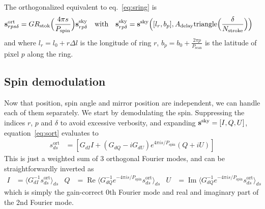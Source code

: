 \documentclass{article}
\renewcommand{\Re}{\operatorname{Re}}
\renewcommand{\Im}{\operatorname{Im}}
\renewcommand{\vec}[1]{{\bf #1}}
\begin{document}
The orthogonalized equivalent to eq.~\ref{eq:sring} is
\begin{align}
	\vec s^\textrm{ort}_{rps\delta} &= G R_\textrm{stok}
		\Big(\frac{4\pi s}{P_\textrm{spin}}\Big) \vec s^\textrm{sky}_{rp\delta} &
		\textrm{with} & &
	\vec s^\textrm{sky}_{rp\delta} &=
		\vec s^\textrm{sky}\Big([l_r,b_p],
		A_\textrm{delay}\textrm{triangle}\Big(\frac{\delta}{N_\textrm{stroke}}\Big)\Big)
	\label{eq:sort}
\end{align}
and where $l_r = l_0 + r\Delta l$ is the longitude of ring $r$,
$b_p = b_0 + \frac{2\pi p}{P_\textrm{scan}}$ is the latitude of pixel $p$
along the ring.

\subsection{Spin demodulation}
Now that position, spin angle and mirror position are independent, we can
handle each of them separately. We start by demodulating the spin.
Suppressing the indices $r$, $p$ and $\delta$ to avoid excessive
verbosity, and expanding $\vec s^\textrm{sky} = [I,Q,U]$, 
equation~\ref{eq:sort} evaluates to
\begin{align}
	s^\textrm{ort}_{ds} &= \left[G_{dI} I +
		(G_{dQ}-iG_{dU})e^{4\pi i s/P_\textrm{spin}} (Q + iU)\right]
\end{align}
This is just a weighted sum of 3 orthogonal Fourier modes,
and can be straightforwardly inverted as
\begin{align}
	I &= \langle G_{dI}^{-1} s^\textrm{ort}_{ds}\rangle_{ds} &
	Q &= \Re \langle G_{dQ}^{-1}
			e^{-4\pi i s/P_\textrm{spin}} s^\textrm{ort}_{ds}\rangle_{ds} &
	U &= \Im \langle G_{dQ}^{-1}
			e^{-4\pi i s/P_\textrm{spin}} s^\textrm{ort}_{ds}\rangle_{ds}
\end{align}
which is simply the gain-correct 0th Fourier mode and
real and imaginary part of the 2nd Fourier mode.
\end{document}
